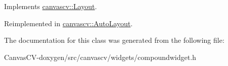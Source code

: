 Implements \hyperlink{classcanvascv_1_1Layout_a7b532816232c436ea5b6e7c4c3254779}{canvascv\+::\+Layout}.



Reimplemented in \hyperlink{classcanvascv_1_1AutoLayout_abc436c90f50a5331c391e351bef9e659}{canvascv\+::\+Auto\+Layout}.



The documentation for this class was generated from the following file\+:\begin{DoxyCompactItemize}
\item 
Canvas\+C\+V-\/doxygen/src/canvascv/widgets/compoundwidget.\+h\end{DoxyCompactItemize}
